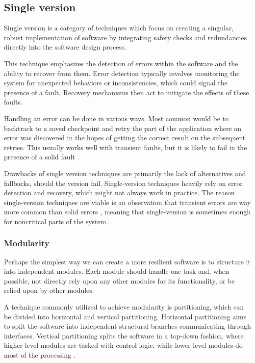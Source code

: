 \documentclass[12pt, letterpaper]{article}
\begin{document}
\subsection{Single version} \label{single}

Single version is a category of techniques which focus on creating a singular, robust implementation of software by integrating safety checks and redundancies directly into the software design process.

This technique emphasizes the detection of errors within the software and the ability to recover from them. Error detection typically involves monitoring the system for unexpected behaviors or inconsistencies, which could signal the presence of a fault. Recovery mechanisms then act to mitigate the effects of these faults.

Handling an error can be done in various ways. Most common would be to backtrack to a saved checkpoint and retry the part of the application where an error was discovered in the hopes of getting the correct result on the subsequent retries. This usually works well with transient faults, but it is likely to fail in the presence of a solid fault \cite{1402092}. 

Drawbacks of single version techniques are primarily the lack of alternatives and fallbacks, should the version fail. Single-version techniques heavily rely on error detection and recovery, which might not always work in practice. The reason single-version techniques are viable is an observation that transient errors are way more common than solid errors \cite{1676899}, meaning that single-version is sometimes enough for noncritical parts of the system.

\subsubsection{Modularity}

Perhaps the simplest way we can create a more resilient software is to structure it into independent modules. Each module should handle one task and, when possible, not directly rely upon any other modules for its functionality, or be relied upon by other modules.

A technique commonly utilized to achieve modularity is partitioning, which can be divided into horizontal and vertical partitioning. Horizontal partitioning aims to split the software into independent structural branches communicating through interfaces. 
Vertical partitioning splits the software in a top-down fashion, where higher level modules are tasked with control logic, while lower level modules do most of the processing \cite{nasa:sft}.
\end{document}
